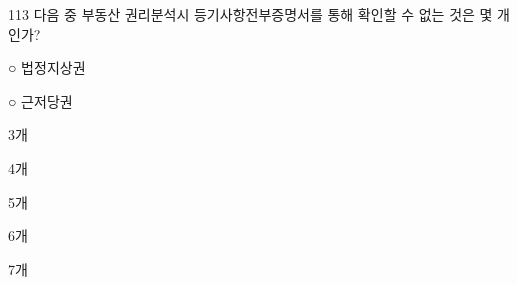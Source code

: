 \begin{question}{113}
다음 중 부동산 권리분석시 등기사항전부증명서를 통해 확인할 수 없는 것은 몇 개인가?
\begin{framedtext}
○ 법정지상권 \par
{}○ 근저당권 \par
\end{framedtext}
\begin{choices}
  \item 3개
  \item 4개
  \item 5개
  \item 6개
  \item 7개
\end{choices}
\end{question}
